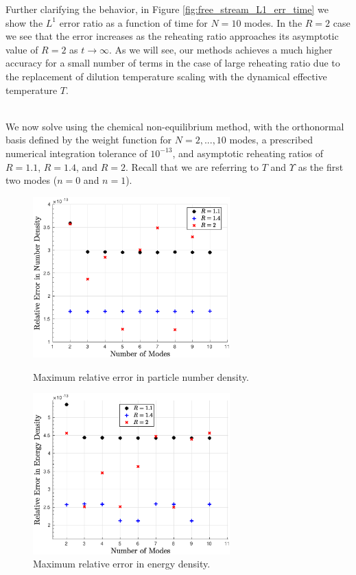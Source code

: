 Further clarifying the behavior, in Figure \ref{fig:free_stream_L1_err_time}  we show the $L^1$ error ratio as a function of time for $N=10$ modes. In the $R=2$ case we see that the error increases as the reheating ratio approaches its asymptotic value of $R=2$ as $t\rightarrow\infty$.  As we will see, our methods achieves a much higher accuracy for a small number of terms in the case of large reheating ratio due to the replacement of dilution temperature scaling with the dynamical effective temperature $T$.  


\\
We now solve   using the chemical non-equilibrium method, with the orthonormal basis defined by the weight function  for $N=2,...,10$ modes, a prescribed numerical integration tolerance of $10^{-13}$, and asymptotic reheating ratios of $R=1.1$, $R=1.4$, and $R=2$.  Recall that we are referring to $T$ and $\Upsilon$ as the first two modes ($n=0$ and $n=1$). 
\begin{figure}[ht]
\begin{minipage}[b]{0.5\linewidth}
\centerline{\includegraphics[height=6.2cm]{06-appendix/SpectralMethodBoltzmann/Figures/keq_num_err.eps}}
\caption{Maximum relative error in particle number density.}\label{fig:keq_num_err}
 \end{minipage}
 \hspace{0.5cm}
 \begin{minipage}[b]{0.5\linewidth}
\centerline{\includegraphics[height=6.2cm]{06-appendix/SpectralMethodBoltzmann/Figures/keq_E_err.eps}}
\caption{Maximum relative error in energy density.}\label{fig:keq_E_err}
\end{minipage}
\end{figure}
